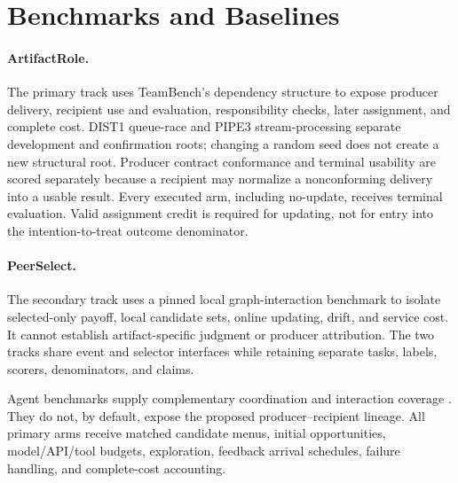 \documentclass[sigconf,anonymous]{aamas}
\begin{document}
\section{Benchmarks and Baselines}
\paragraph{ArtifactRole.} The primary track uses TeamBench's dependency structure \cite{kim2026teambench} to expose producer delivery, recipient use and evaluation, responsibility checks, later assignment, and complete cost. DIST1 queue-race and PIPE3 stream-processing separate development and confirmation roots; changing a random seed does not create a new structural root. Producer contract conformance and terminal usability are scored separately because a recipient may normalize a nonconforming delivery into a usable result. Every executed arm, including no-update, receives terminal evaluation. Valid assignment credit is required for updating, not for entry into the intention-to-treat outcome denominator.

\paragraph{PeerSelect.} The secondary track uses a pinned local graph-interaction benchmark to isolate selected-only payoff, local candidate sets, online updating, drift, and service cost. It cannot establish artifact-specific judgment or producer attribution. The two tracks share event and selector interfaces while retaining separate tasks, labels, scorers, denominators, and claims.

Agent benchmarks supply complementary coordination and interaction coverage \cite{zhu2025multiagentbench,agashe2025llmcoordination,liu2024agentbench,appworld2024,yao2024taubench}. They do not, by default, expose the proposed producer--recipient lineage. All primary arms receive matched candidate menus, initial opportunities, model/API/tool budgets, exploration, feedback arrival schedules, failure handling, and complete-cost accounting.
\end{document}
